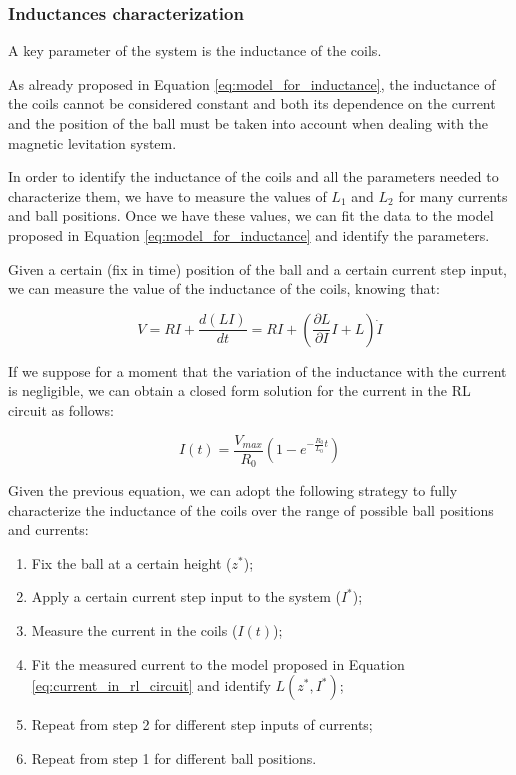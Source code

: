 \subsubsection{Inductances characterization}
\label{subsubsec:inductances_characterization}

A key parameter of the system is the inductance of the coils.

As already proposed in Equation \ref{eq:model_for_inductance}, the inductance of the coils cannot be considered constant and both its dependence on the current and the position of the ball must be taken into account when dealing with the magnetic levitation system.

In order to identify the inductance of the coils and all the parameters needed to characterize them, we have to measure the values of $L_1$ and $L_2$ for many currents and ball positions.
Once we have these values, we can fit the data to the model proposed in Equation \ref{eq:model_for_inductance} and identify the parameters.

Given a certain (fix in time) position of the ball and a certain current step input, we can measure the value of the inductance of the coils, knowing that:

\begin{equation}
    V = R I + \frac{d (L I)}{d t} = R I + \left( \frac{\partial L}{\partial I} I + L \right) \dot{I}
\end{equation}

If we suppose for a moment that the variation of the inductance with the current is negligible, we can obtain a closed form solution for the current in the RL circuit as follows:

\begin{equation}
    I(t) = \frac{V_{max}}{R_0} \left( 1 - e^{- \frac{R_0}{L_0} t} \right)
    \label{eq:current_in_rl_circuit}
\end{equation}

Given the previous equation, we can adopt the following strategy to fully characterize the inductance of the coils over the range of possible ball positions and currents:

\begin{enumerate}
    \item Fix the ball at a certain height ($z^*$);
    \item Apply a certain current step input to the system ($I^*$);
    \item Measure the current in the coils ($I(t)$);
    \item Fit the measured current to the model proposed in Equation \ref{eq:current_in_rl_circuit} and identify $L(z^*, I^*)$;
    \item Repeat from step 2 for different step inputs of currents;
    \item Repeat from step 1 for different ball positions.
\end{enumerate}

